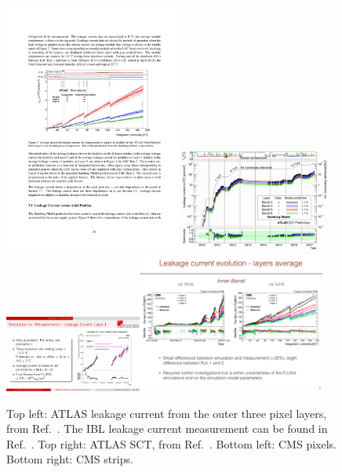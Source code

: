 \begin{figure}[h!]
\centering
\includegraphics[width=0.52\textwidth]{figures/SensorMeasurements/LeakageCurrent/ATLAS-blayerL1L2}\includegraphics[width=0.45\textwidth]{figures/SensorMeasurements/LeakageCurrent/ATLAS-SCT.png}
\includegraphics[width=0.4\textwidth]{figures/SensorMeasurements/LeakageCurrent/CMS-pixels}\includegraphics[width=0.55\textwidth]{figures/SensorMeasurements/LeakageCurrent/CMS-strips}
\caption{Top left: ATLAS leakage current from the outer three pixel layers, from Ref.~\cite{ATL-INDET-PUB-2019-001}.  The IBL leakage current measurement can be found in Ref.~\cite{ATL-INDET-INT-2019-012}.  Top right: ATLAS SCT, from Ref.~\cite{ATL-SCT-2018-002}.  Bottom left: CMS pixels.  Bottom right: CMS strips.}
\label{lab:sensormeasurements:Leakage:ATLAS1}
\end{figure}

